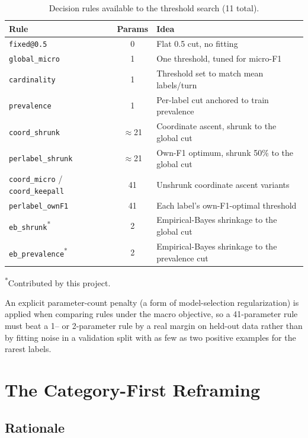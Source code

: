\begin{table}[H]
\centering
\caption{Decision rules available to the threshold search (11 total).}
\label{tab:decision-rules}
\begin{tabular}{@{}lcp{6.6cm}@{}}
\toprule
\textbf{Rule} & \textbf{Params} & \textbf{Idea} \\
\midrule
\texttt{fixed@0.5} & 0 & Flat 0.5 cut, no fitting \\
\texttt{global\_micro} & 1 & One threshold, tuned for micro-F1 \\
\texttt{cardinality} & 1 & Threshold set to match mean labels/turn \\
\texttt{prevalence} & 1 & Per-label cut anchored to train prevalence \\
\texttt{coord\_shrunk} & $\approx$21 & Coordinate ascent, shrunk to the global cut \\
\texttt{perlabel\_shrunk} & $\approx$21 & Own-F1 optimum, shrunk 50\% to the global cut \\
\texttt{coord\_micro} / \texttt{coord\_keepall} & 41 & Unshrunk coordinate ascent variants \\
\texttt{perlabel\_ownF1} & 41 & Each label's own-F1-optimal threshold \\
\texttt{eb\_shrunk}\textsuperscript{*} & 2 & Empirical-Bayes shrinkage to the global cut \\
\texttt{eb\_prevalence}\textsuperscript{*} & 2 & Empirical-Bayes shrinkage to the prevalence cut \\
\bottomrule
\end{tabular}
\raggedright\footnotesize\textsuperscript{*}Contributed by this project.
\end{table}

An explicit parameter-count penalty (a form of model-selection regularization)
is applied when comparing rules under the macro objective, so a
41-parameter rule must beat a 1-- or 2-parameter rule by a real margin on
held-out data rather than by fitting noise in a validation split with as few
as two positive examples for the rarest labels.

\section{The Category-First Reframing}
\label{sec:category-first}

\subsection{Rationale}

